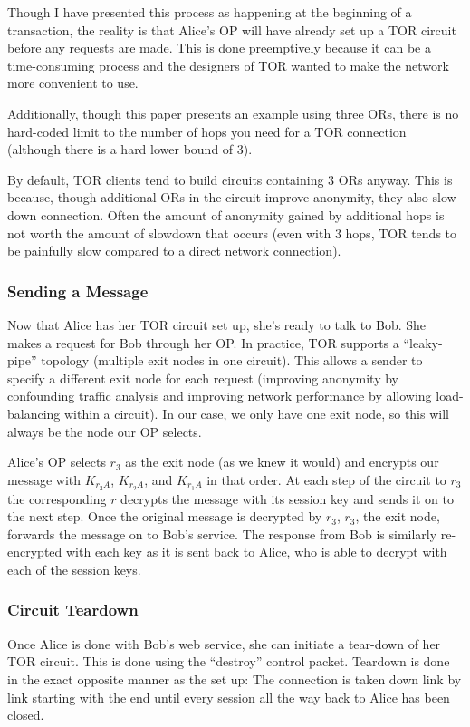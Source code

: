 \documentclass[letterpaper, titlepage, 12pt]{article}
\begin{document}
Though I have presented this process as happening at the beginning of a transaction, the reality is that Alice's OP will have already set up a TOR circuit before any requests are made. This is done preemptively because it can be a time-consuming process and the designers of TOR wanted to make the network more convenient to use.

Additionally, though this paper presents an example using three ORs, there is no hard-coded limit to the number of hops you need for a TOR connection (although there is a hard lower bound of 3).

By default, TOR clients tend to build circuits containing 3 ORs anyway. This is because, though additional ORs in the circuit improve anonymity, they also slow down connection. Often the amount of anonymity gained by additional hops is not worth the amount of slowdown that occurs (even with 3 hops, TOR tends to be painfully slow compared to a direct network connection).
\subsubsection{Sending a Message}
Now that Alice has her TOR circuit set up, she's ready to talk to Bob. She makes a request for Bob through her OP. In practice, TOR supports a ``leaky-pipe'' topology (multiple exit nodes in one circuit). This allows a sender to specify a different exit node for each request (improving anonymity by confounding traffic analysis and improving network performance by allowing load-balancing within a circuit). In our case, we only have one exit node, so this will always be the node our OP selects.

Alice's OP selects $r_3$ as the exit node (as we knew it would) and encrypts our message with $K_{r_3A}$, $K_{r_2A}$, and $K_{r_1A}$ in that order. At each step of the circuit to $r_3$ the corresponding $r$ decrypts the message with its session key and sends it on to the next step. Once the original message is decrypted by $r_3$, $r_3$, the exit node, forwards the message on to Bob's service. The response from Bob is similarly re-encrypted with each key as it is sent back to Alice, who is able to decrypt with each of the session keys.

\subsubsection{Circuit Teardown}
Once Alice is done with Bob's web service, she can initiate a tear-down of her TOR circuit. This is done using the ``destroy'' control packet. Teardown is done in the exact opposite manner as the set up: The connection is taken down link by link starting with the end until every session all the way back to Alice has been closed.
\end{document}
